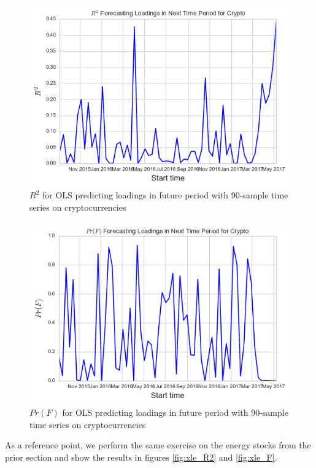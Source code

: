 \documentclass[12pt,twoside]{article}
\begin{document}
\bigbreak
\begin{figure}[H]
	\centering
	\includegraphics[scale=.7]{crypto_R2_90D.png}
	\caption{$R^2$ for OLS predicting loadings in future period with 90-sample time series on cryptocurrencies}
	\label{fig:crypto_R2}
\end{figure}
\bigbreak

\bigbreak
\begin{figure}[H]
	\centering
	\includegraphics[scale=.7]{crypto_F_90D.png}
	\caption{$Pr(F)$ for OLS predicting loadings in future period with 90-sample time series on cryptocurrencies}
	\label{fig:crypto_F}
\end{figure}
\bigbreak

As a reference point, we perform the same exercise on the energy stocks from the prior section and show the results in figures \ref{fig:xle_R2} and \ref{fig:xle_F}.
\end{document}
